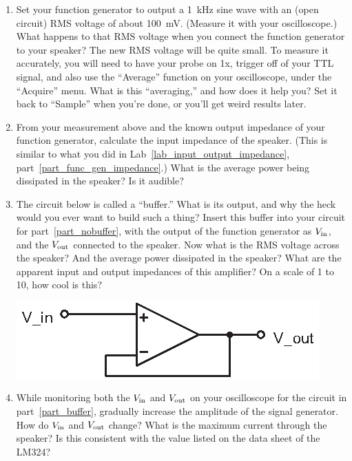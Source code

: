 \begin{enumerate}[wide]
\item Set your function generator to output a 1~kHz sine wave with an (open circuit) RMS voltage of about 100~mV.  (Measure it with your oscilloscope.)  What happens to that RMS voltage when you connect the function generator to your speaker?  The new RMS voltage will be quite small.  To measure it accurately, you will need to have your probe on 1x, trigger off of your TTL signal, and also use the ``Average'' function on your oscilloscope, under the ``Acquire'' menu.  What is this ``averaging,'' and how does it help you?  Set it back to ``Sample'' when you're done, or you'll get weird results later.

\item From your measurement above and the known output impedance of your function generator, calculate the input impedance of the speaker.  (This is similar to what you did in Lab~\ref{lab_input_output_impedance}, part~\ref{part_func_gen_impedance}.)  What is the average power being dissipated in the speaker?  Is it audible? \label{part_nobuffer}

\item The circuit below is called a ``buffer.'' What is its output, and why the heck would you ever want to build such a thing?  Insert this buffer into your circuit for part~\ref{part_nobuffer}, with the output of the function generator as $V_{\rm in}$, and the $V_{\rm out}$ connected to the speaker.  Now what is the RMS voltage across the speaker?  And the average power dissipated in the speaker?  What are the apparent input and output impedances of this amplifier?  On a scale of 1 to 10, how cool is this? \label{part_buffer}
\begin{center}
\includegraphics{op-amps/buffer.eps}
\end{center}


\item While monitoring both the $V_{\rm in}$ and $V_{\rm out}$ on your oscilloscope for the circuit in part~\ref{part_buffer}, gradually increase the amplitude of the signal generator.  How do $V_{\rm in}$ and $V_{\rm out}$ change?  What is the maximum current through the speaker?  Is this consistent with the value listed on the data sheet of the LM324? 


\end{enumerate}
